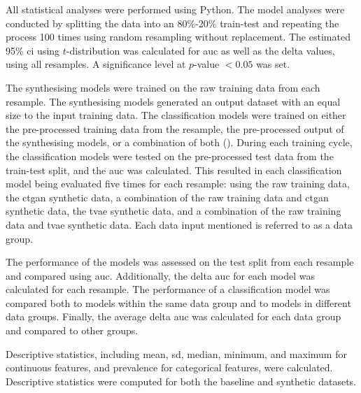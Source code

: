 \documentclass[12pt, letterpaper]{article}
\begin{document}
All statistical analyses were performed using Python. The model analyses were conducted by splitting the data into an 80\%-20\% train-test and repeating the process 100 times using random resampling without replacement. The estimated 95\% \acrfull{ci} using $t$-distribution was calculated for \acrfull{auc} as well as the delta values, using all resamples. A significance level at $p$-value $< 0.05$ was set.

The synthesising models were trained on the raw training data from each resample. The synthesising models generated an output dataset with an equal size to the input training data. The classification models were trained on either the pre-processed training data from the resample, the pre-processed output of the synthesising models, or a combination of both (). During each training cycle, the classification models were tested on the pre-processed test data from the train-test split, and the \acrshort{auc} was calculated. This resulted in each classification model being evaluated five times for each resample: using the raw training data, the \acrshort{ctgan} synthetic data, a combination of the raw training data and \acrshort{ctgan} synthetic data, the \acrshort{tvae} synthetic data, and a combination of the raw training data and \acrshort{tvae} synthetic data. Each data input mentioned is referred to as a data group.

The performance of the models was assessed on the test split from each resample and compared using \acrshort{auc}. Additionally, the delta \acrshort{auc} for each model was calculated for each resample. The performance of a classification model was compared both to models within the same data group and to models in different data groups. Finally, the average delta \acrshort{auc} was calculated for each data group and compared to other groups.

Descriptive statistics, including mean, \acrfull{sd}, median, minimum, and maximum for continuous features, and prevalence for categorical features, were calculated. Descriptive statistics were computed for both the baseline and synthetic datasets.
\end{document}
